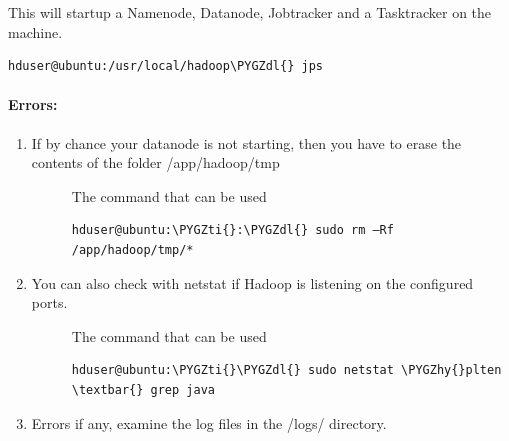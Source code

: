 \documentclass[letterpaper,10pt,english]{sphinxmanual}
\def\PYGZdl{\char`\$}
\def\PYGZhy{\char`\-}
\def\PYGZti{\char`\~}
\begin{document}
This will startup a Namenode, Datanode, Jobtracker and a Tasktracker on the machine.

\begin{Verbatim}[commandchars=\\\{\}]
hduser@ubuntu:/usr/local/hadoop\PYGZdl{} jps
\end{Verbatim}
\begin{figure}[htbp]
\centering

\end{figure}


\paragraph{Errors:}
\label{hadoop:errors}\begin{enumerate}
\item {} \begin{description}
\item[{If by chance your datanode is not starting, then you have to erase the contents of the folder /app/hadoop/tmp}] \leavevmode
The command that can be used

\begin{Verbatim}[commandchars=\\\{\}]
hduser@ubuntu:\PYGZti{}:\PYGZdl{} sudo rm –Rf /app/hadoop/tmp/*
\end{Verbatim}

\end{description}

\item {} \begin{description}
\item[{You can also check with netstat if Hadoop is listening on the configured ports.}] \leavevmode
The command that can be used

\begin{Verbatim}[commandchars=\\\{\}]
hduser@ubuntu:\PYGZti{}\PYGZdl{} sudo netstat \PYGZhy{}plten \textbar{} grep java
\end{Verbatim}

\end{description}

\item {} 
Errors if any, examine the log files in the /logs/ directory.

\end{enumerate}
\end{document}

